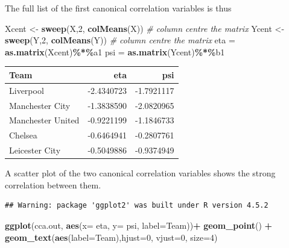 \documentclass[
]{book}
\newenvironment{Shaded}{\begin{snugshade}}{\end{snugshade}}
\newcommand{\AttributeTok}[1]{\textcolor[rgb]{0.13,0.29,0.53}{#1}}
\newcommand{\CommentTok}[1]{\textcolor[rgb]{0.56,0.35,0.01}{\textit{#1}}}
\newcommand{\DecValTok}[1]{\textcolor[rgb]{0.00,0.00,0.81}{#1}}
\newcommand{\FunctionTok}[1]{\textcolor[rgb]{0.13,0.29,0.53}{\textbf{#1}}}
\newcommand{\NormalTok}[1]{#1}
\newcommand{\OtherTok}[1]{\textcolor[rgb]{0.56,0.35,0.01}{#1}}
\newcommand{\SpecialCharTok}[1]{\textcolor[rgb]{0.81,0.36,0.00}{\textbf{#1}}}
\theoremstyle{definition}
\theoremstyle{definition}
\theoremstyle{definition}
\theoremstyle{definition}
\theoremstyle{remark}
\begin{document}
The full list of the first canonical correlation variables is thus

\begin{Shaded}
\begin{Highlighting}[]
\NormalTok{Xcent }\OtherTok{\textless{}{-}} \FunctionTok{sweep}\NormalTok{(X,}\DecValTok{2}\NormalTok{, }\FunctionTok{colMeans}\NormalTok{(X)) }\CommentTok{\# column centre the matrix}
\NormalTok{Ycent }\OtherTok{\textless{}{-}} \FunctionTok{sweep}\NormalTok{(Y,}\DecValTok{2}\NormalTok{, }\FunctionTok{colMeans}\NormalTok{(Y)) }\CommentTok{\# column centre the matrix}
\NormalTok{eta }\OtherTok{=} \FunctionTok{as.matrix}\NormalTok{(Xcent)}\SpecialCharTok{\%*\%}\NormalTok{a1}
\NormalTok{psi }\OtherTok{=} \FunctionTok{as.matrix}\NormalTok{(Ycent)}\SpecialCharTok{\%*\%}\NormalTok{b1}
\end{Highlighting}
\end{Shaded}

\begin{tabular}{lrr}
\toprule
Team & eta & psi\\
\midrule
Liverpool & -2.4340723 & -1.7921117\\
Manchester City & -1.3838590 & -2.0820965\\
Manchester United & -0.9221199 & -1.1846733\\
Chelsea & -0.6464941 & -0.2807761\\
Leicester City & -0.5049886 & -0.9374949\\
\bottomrule
\end{tabular}

A scatter plot of the two canonical correlation variables shows the strong correlation between them.

\begin{Shaded}
\end{Shaded}

\begin{verbatim}
## Warning: package 'ggplot2' was built under R version 4.5.2
\end{verbatim}

\begin{Shaded}
\begin{Highlighting}[]
\FunctionTok{ggplot}\NormalTok{(cca.out, }\FunctionTok{aes}\NormalTok{(}\AttributeTok{x=}\NormalTok{ eta, }\AttributeTok{y=}\NormalTok{ psi, }\AttributeTok{label=}\NormalTok{Team))}\SpecialCharTok{+}   \FunctionTok{geom\_point}\NormalTok{() }\SpecialCharTok{+}
\FunctionTok{geom\_text}\NormalTok{(}\FunctionTok{aes}\NormalTok{(}\AttributeTok{label=}\NormalTok{Team),}\AttributeTok{hjust=}\DecValTok{0}\NormalTok{, }\AttributeTok{vjust=}\DecValTok{0}\NormalTok{, }\AttributeTok{size=}\DecValTok{4}\NormalTok{)}
\end{Highlighting}
\end{Shaded}
\end{document}
